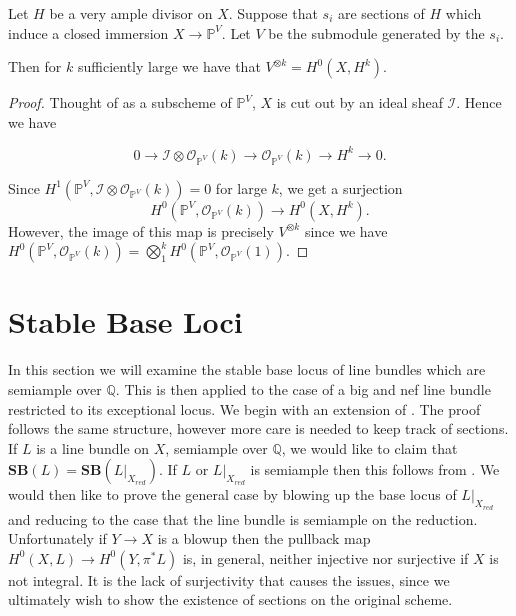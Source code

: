 \documentclass[a4paper,12pt]{book}
\newcommand{\SB}{\mathbf{SB}}
\newcommand{\ox}[1][X]{\mathcal{O}_{#1}}
\begin{document}
\begin{lemma}\label{ampall}
	
	Let $H$ be a very ample divisor on $X$. Suppose that $s_{i}$ are sections of $H$ which induce a closed immersion $X \to \mathbb{P}^{V}$. Let $V$ be the submodule generated by the $s_{i}$.
	
	Then for $k$ sufficiently large we have that $V^{\otimes k}=H^{0}(X,H^{k})$.
	
\end{lemma}

\begin{proof}
	
	Thought of as a subscheme of $\mathbb{P}^{V}$, $X$ is cut out by an ideal sheaf $\mathcal{I}$. Hence we have 
	
	\[0 \to \mathcal{I}\otimes \ox[\mathbb{P}^{V}](k) \to \ox[\mathbb{P}^{V}](k) \to H^{k} \to 0.\]
	
	Since $H^{1}(\mathbb{P}^{V}, \mathcal{I}\otimes \ox[\mathbb{P}^{V}](k))=0$ for large $k$, we get a surjection $$H^{0}(\mathbb{P}^{V},\ox[\mathbb{P}^{V}](k)) \to H^{0}(X,H^{k}).$$ However, the image of this map is precisely $V^{\otimes k}$ since we have $H^{0}(\mathbb{P}^{V},\ox[\mathbb{P}^{V}](k))=\bigotimes_{1}^{k}H^{0}(\mathbb{P}^{V},\ox[\mathbb{P}^{V}](1))$.
	
	
	
\end{proof}

\section{Stable Base Loci}

In this section we will examine the stable base locus of line bundles which are semiample over $\mathbb{Q}$. This is then applied to the case of a big and nef line bundle restricted to its exceptional locus.  We begin with an extension of \cite[Theorem 1.10]{witaszek2020keels}. The proof follows the same structure, however more care is needed to keep track of sections.\\

If $L$ is a line bundle on $X$, semiample over $\mathbb{Q}$, we would like to claim that $\SB(L)=\SB(L|_{X_{red}})$. If $L$ or $L|_{X_{red}}$ is semiample then this follows from \cite[Thereom 1.10]{witaszek2020keels}. We would then like to prove the general case by blowing up the base locus of $L|_{X_{red}}$ and reducing to the case that the line bundle is semiample on the reduction. Unfortunately if $Y \to X$ is a blowup then the pullback map $H^{0}(X,L) \to H^{0}(Y,\pi^{*}L)$ is, in general, neither injective nor surjective if $X$ is not integral. It is the lack of surjectivity that causes the issues, since we ultimately wish to show the existence of sections on the original scheme.\\ 
\end{document}

